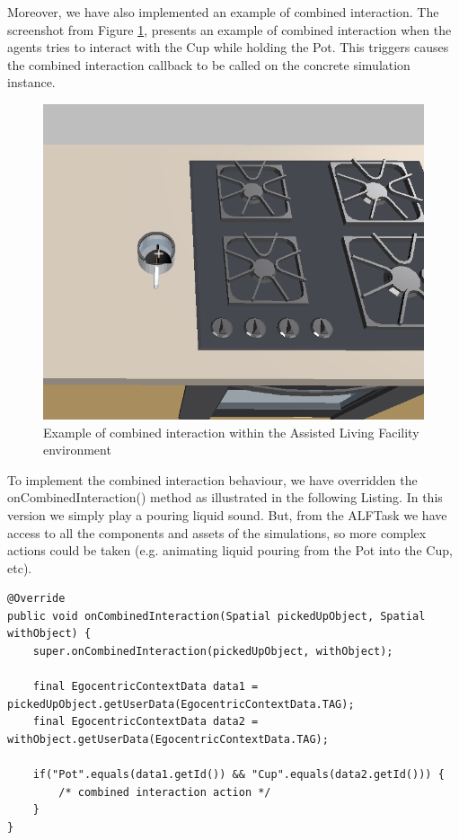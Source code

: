 Moreover, we have also implemented an example of combined interaction. The screenshot from Figure \ref{fig:impl_combined_interaction}, presents an example of combined interaction when the agents tries to interact with the Cup while holding the Pot. This triggers causes the combined interaction callback to be called on the concrete simulation instance.
\begin{figure}[H]
	\centering
	\includegraphics[width=0.8\linewidth]{gfx/Chapter4/pot_with_cup}
	\caption{Example of combined interaction within the Assisted Living Facility environment}
	\label{fig:impl_combined_interaction}
\end{figure}

To implement the combined interaction behaviour, we have overridden the onCombinedInteraction() method as illustrated in the following Listing. In this version we simply play a pouring liquid sound. But, from the ALFTask we have access to all the components and assets of the simulations, so more complex actions could be taken (e.g. animating liquid pouring from the Pot into the Cup, etc).
\begin{lstlisting}[caption={Snippet of code illustrating how to implement a COMBINED interaction between two objects (when the agent acts upon an object while holding another object)},label={lst:combined_interaction}]
@Override
public void onCombinedInteraction(Spatial pickedUpObject, Spatial withObject) {
    super.onCombinedInteraction(pickedUpObject, withObject);    
    
    final EgocentricContextData data1 = pickedUpObject.getUserData(EgocentricContextData.TAG);
    final EgocentricContextData data2 = withObject.getUserData(EgocentricContextData.TAG);

    if("Pot".equals(data1.getId()) && "Cup".equals(data2.getId())) {
        /* combined interaction action */
    }
}
\end{lstlisting}

